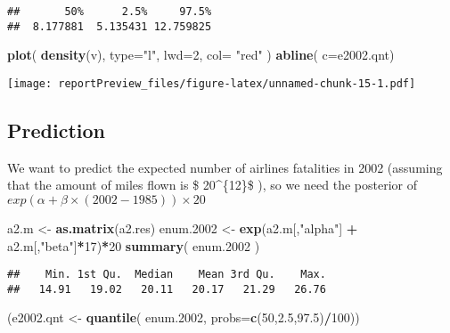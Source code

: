 \documentclass[]{article}
\newenvironment{Shaded}{\begin{snugshade}}{\end{snugshade}}
\newcommand{\KeywordTok}[1]{\textcolor[rgb]{0.13,0.29,0.53}{\textbf{#1}}}
\newcommand{\DataTypeTok}[1]{\textcolor[rgb]{0.13,0.29,0.53}{#1}}
\newcommand{\DecValTok}[1]{\textcolor[rgb]{0.00,0.00,0.81}{#1}}
\newcommand{\FloatTok}[1]{\textcolor[rgb]{0.00,0.00,0.81}{#1}}
\newcommand{\StringTok}[1]{\textcolor[rgb]{0.31,0.60,0.02}{#1}}
\newcommand{\OperatorTok}[1]{\textcolor[rgb]{0.81,0.36,0.00}{\textbf{#1}}}
\newcommand{\NormalTok}[1]{#1}
\begin{document}
\begin{verbatim}
##       50%      2.5%     97.5% 
##  8.177881  5.135431 12.759825
\end{verbatim}

\begin{Shaded}
\begin{Highlighting}[]
\KeywordTok{plot}\NormalTok{( }\KeywordTok{density}\NormalTok{(v), }\DataTypeTok{type=}\StringTok{"l"}\NormalTok{, }\DataTypeTok{lwd=}\DecValTok{2}\NormalTok{, }\DataTypeTok{col=} \StringTok{"red"}\NormalTok{ )}
\KeywordTok{abline}\NormalTok{( }\DataTypeTok{c=}\NormalTok{e2002.qnt)}
\end{Highlighting}
\end{Shaded}

\texttt{[image: reportPreview\_files/figure-latex/unnamed-chunk-15-1.pdf]}

\subsection{Prediction}\label{prediction}

We want to predict the expected number of airlines fatalities in 2002
(assuming that the amount of miles flown is \$ 20\^{}\{12\}\$
), so we need the posterior of
\(exp( \alpha + \beta \times (2002-1985))\times 20\)

\begin{Shaded}
\begin{Highlighting}[]
\NormalTok{a2.m <-}\StringTok{ }\KeywordTok{as.matrix}\NormalTok{(a2.res)}
\NormalTok{enum.}\DecValTok{2002}\NormalTok{ <-}\StringTok{ }\KeywordTok{exp}\NormalTok{(a2.m[,}\StringTok{"alpha"}\NormalTok{] }\OperatorTok{+}\StringTok{ }\NormalTok{a2.m[,}\StringTok{"beta"}\NormalTok{]}\OperatorTok{*}\DecValTok{17}\NormalTok{)}\OperatorTok{*}\DecValTok{20}
\KeywordTok{summary}\NormalTok{( enum.}\DecValTok{2002}\NormalTok{ )}
\end{Highlighting}
\end{Shaded}

\begin{verbatim}
##    Min. 1st Qu.  Median    Mean 3rd Qu.    Max. 
##   14.91   19.02   20.11   20.17   21.29   26.76
\end{verbatim}

\begin{Shaded}
\begin{Highlighting}[]
\NormalTok{(e2002.qnt <-}\StringTok{ }\KeywordTok{quantile}\NormalTok{( enum.}\DecValTok{2002}\NormalTok{, }\DataTypeTok{probs=}\KeywordTok{c}\NormalTok{(}\DecValTok{50}\NormalTok{,}\FloatTok{2.5}\NormalTok{,}\FloatTok{97.5}\NormalTok{)}\OperatorTok{/}\DecValTok{100}\NormalTok{))}
\end{Highlighting}
\end{Shaded}
\end{document}
